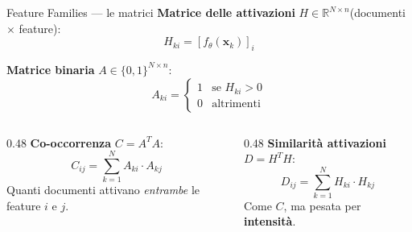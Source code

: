 \documentclass[aspectratio=169, 10pt]{beamer}
\begin{document}
\begin{frame}{Feature Families --- le matrici}
    \textbf{Matrice delle attivazioni} $H \in \mathbb{R}^{N \times n}$\quad (documenti $\times$ feature):
    \[
        H_{ki} = \left[ f_\theta(\mathbf{x}_k) \right]_i
    \]

    \vspace{0.2cm}
    \textbf{Matrice binaria} $A \in \{0,1\}^{N \times n}$:
    \[
        A_{ki} = \begin{cases} 1 & \text{se } H_{ki} > 0 \\ 0 & \text{altrimenti} \end{cases}
    \]

    \vspace{0.2cm}
    \begin{columns}
        \begin{column}{0.48\textwidth}
            \textbf{Co-occorrenza} $C = A^T A$:
            \[
                C_{ij} = \sum_{k=1}^{N} A_{ki} \cdot A_{kj}
            \]
            {\small Quanti documenti attivano \textit{entrambe} le feature $i$ e $j$.}
        \end{column}
        \begin{column}{0.48\textwidth}
            \textbf{Similarit\`a attivazioni} $D = H^T H$:
            \[
                D_{ij} = \sum_{k=1}^{N} H_{ki} \cdot H_{kj}
            \]
            {\small Come $C$, ma pesata per \textbf{intensit\`a}.}
        \end{column}
    \end{columns}
\end{frame}
\end{document}
